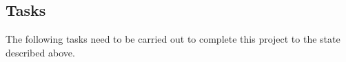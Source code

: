
\subsection*{Tasks}

The following tasks need to be carried out to complete this project to the state described above.

